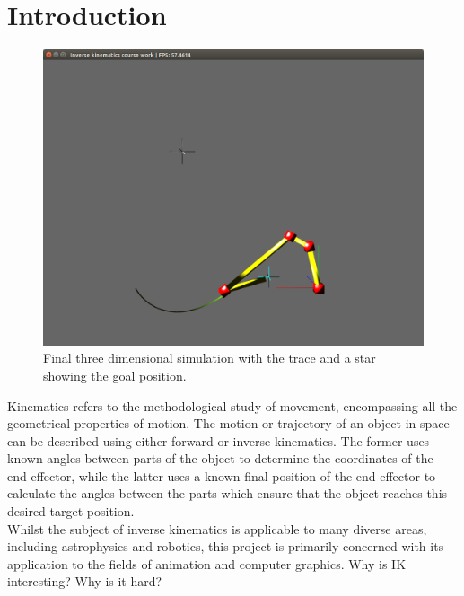 \documentclass[paper=a4, fontsize=11pt]{scrartcl} %
\numberwithin{equation}{section} %
\numberwithin{figure}{section} %
\numberwithin{table}{section} %
\begin{document}
\section{Introduction}
\begin{figure}
\centering
\includegraphics[scale=0.4]{chain3Dexample}
\caption{Final three dimensional simulation with the trace and a star showing the goal position.}
\label{fig:3Dpicture}
\end{figure}

Kinematics refers to the methodological study of movement, encompassing all the geometrical properties of motion. The motion or trajectory of an object in space can be described using either forward or inverse kinematics. The former uses known angles between parts of the object to determine the coordinates of the end-effector, while the latter uses a known final position of the end-effector to calculate the angles between the parts which ensure that the object reaches this desired target position. \\

Whilst the subject of inverse kinematics is applicable to many diverse areas, including astrophysics and robotics, this project is primarily concerned with its application to the fields of animation and computer graphics. Why is IK interesting? Why is it hard?\\
\end{document}
